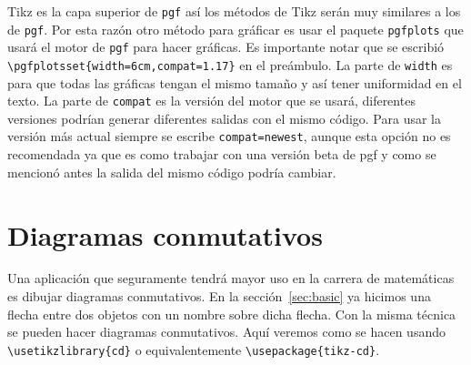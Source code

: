Tikz es la capa superior de \texttt{pgf} así los métodos de Tikz serán muy
similares a los de \texttt{pgf}. Por esta razón otro método para gráficar es
usar el paquete \texttt{pgfplots} que usará el motor de \texttt{pgf} para
hacer gráficas. Es importante notar que se escribió
\verb|\pgfplotsset{width=6cm,compat=1.17}| en el preámbulo. La parte de
\texttt{width} es para que todas las gráficas tengan el mismo tamaño y así
tener uniformidad en el texto. La parte de \texttt{compat} es la versión del
motor que se usará, diferentes versiones podrían generar diferentes salidas
con el mismo código. Para usar la versión más actual siempre se escribe
\texttt{compat=newest}, aunque esta opción no es recomendada ya que es como
trabajar con una versión beta de pgf y como se mencionó antes la salida del
mismo código podría cambiar.
\begin{center}
\end{center}


\section{Diagramas conmutativos}
Una aplicación que seguramente tendrá mayor uso en la carrera de matemáticas
es dibujar diagramas conmutativos. En la sección~\ref{sec:basic} ya hicimos
una flecha entre dos objetos con un nombre sobre dicha flecha. Con la misma
técnica se pueden hacer diagramas conmutativos. Aquí veremos como se
hacen usando \verb|\usetikzlibrary{cd}| o equivalentemente
\verb|\usepackage{tikz-cd}|.
\begin{center}
\end{center}

